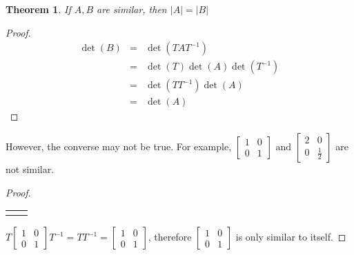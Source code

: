 \documentclass{article}
\theoremstyle{MyNonumberplain}
\theoremstyle{break}
\newtheorem*{proof}{Proof. }
\newcommand{\nline}{\begin{tabular}{ll}&\\\end{tabular}}
\newcommand{\infixand}{\text{ and }}
\theoremstyle{break}
\newtheorem{theorem}{Theorem}[section]
\theoremstyle{break}
\theoremstyle{definition}
\theoremstyle{break}
\begin{document}
\begin{thmbox}
    \begin{theorem}
        If $A, B$ are similar, then $| A | = | B |$
    \end{theorem}
    \begin{prfbox}
        \begin{proof}
            \begin{eqnarray*}
                \det (B) & = & \det (T A T^{- 1})\\
                & = & \det (T) \det (A) \det (T^{- 1})\\
                & = & \det (T T^{- 1}) \det (A)\\
                & = & \det (A)
            \end{eqnarray*}
        \end{proof}
    \end{prfbox}
    However, the converse may not be true. For example, $\left[\begin{array}{cc}
        1 & 0\\
        0 & 1
      \end{array}\right] \infixand \left[\begin{array}{cc}
        2 & 0\\
        0 & \frac{1}{2}
      \end{array}\right]$ are not similar.
      \begin{prfbox}
        \begin{proof}

            \nline

            $T \left[\begin{array}{cc}
                1 & 0\\
                0 & 1
              \end{array}\right] T^{- 1} = T T^{- 1} = \left[\begin{array}{cc}
                1 & 0\\
                0 & 1
              \end{array}\right]$, therefore $\left[\begin{array}{cc}
                1 & 0\\
                0 & 1
              \end{array}\right]$ is only similar to itself.
        \end{proof}
    \end{prfbox}
\end{thmbox}
\end{document}
